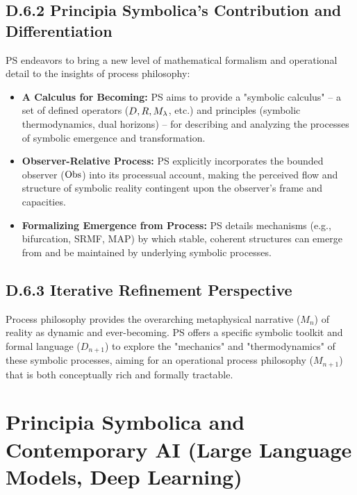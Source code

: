 \subsection*{D.6.2 Principia Symbolica's Contribution and Differentiation} \label{subsec:appD_process_philosophy_contribution_differentiation}
PS endeavors to bring a new level of mathematical formalism and operational detail to the insights of process philosophy:
\begin{itemize}
    \item \textbf{A Calculus for Becoming:} PS aims to provide a "symbolic calculus" – a set of defined operators (\(D, R, M_\lambda\), etc.) and principles (symbolic thermodynamics, dual horizons) – for describing and analyzing the processes of symbolic emergence and transformation.
    \item \textbf{Observer-Relative Process:} PS explicitly incorporates the bounded observer (\(\mathrm{Obs}\)) into its processual account, making the perceived flow and structure of symbolic reality contingent upon the observer's frame and capacities.
    \item \textbf{Formalizing Emergence from Process:} PS details mechanisms (e.g., bifurcation, SRMF, MAP) by which stable, coherent structures can emerge from and be maintained by underlying symbolic processes.
\end{itemize}
\subsection*{D.6.3 Iterative Refinement Perspective}
\label{subsec:appD_process_philosophy_iterative_refinement_perspective}
Process philosophy provides the overarching metaphysical narrative (\(M_n\)) of reality as dynamic and ever-becoming. PS offers a specific symbolic toolkit and formal language (\(D_{n+1}\)) to explore the "mechanics" and "thermodynamics" of these symbolic processes, aiming for an operational process philosophy (\(M_{n+1}\)) that is both conceptually rich and formally tractable.
\section*{Principia Symbolica and Contemporary AI (Large Language Models, Deep Learning)} \label{sec:appD_ps_and_contemporary_ai}
